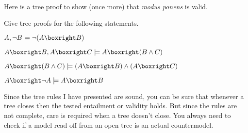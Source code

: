 
Here is a tree proof to show (once more) that \emph{modus ponens} is valid.

\begin{center}
\end{center}

\begin{exercise}
  Give tree proofs for the following statements.
  \begin{exlist}
  \item $A, \neg B \models \neg(A\boxright B)$ 
  \item $A\boxright B, A\boxright C \models  A \boxright (B \land C)$ 
  \item $A \boxright (B \land C) \models (A \boxright B) \land (A\boxright C)$
  \item $A\boxright \neg A \models A\boxright B$ 
  \end{exlist}
\end{exercise}

Since the tree rules I have presented are sound, you can be sure that whenever a
tree closes then the tested entailment or validity holds.  But since the rules
are not complete, care is required when a tree doesn't close. You always need to
check if a model read off from an open tree is an actual countermodel.

